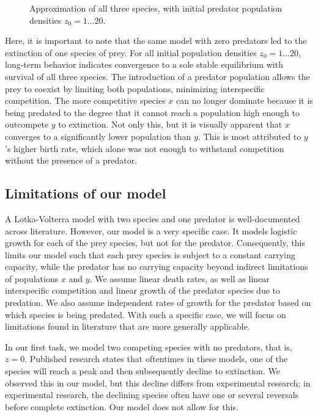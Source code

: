\begin{figure}[h]
    \centering
    \caption{Approximation of all three species, with initial predator population densities $z_0=1... 20$.}
    \label{fig:predator}
\end{figure}

Here, it is important to note that the same model with zero predators led to the extinction of one species of prey. For all initial population densities $z_0=1... 20$, long-term behavior indicates convergence to a sole stable equilibrium with survival of all three species. The introduction of a predator population allows the prey to coexist by limiting both populations, minimizing interspecific competition. The more competitive species $x$ can no longer dominate because it is being predated to the degree that it cannot reach a population high enough to outcompete $y$ to extinction.  Not only this, but it is visually apparent that $x$ converges to a significantly lower population than $y$. This is most attributed to $y$'s higher birth rate, which alone was not enough to withstand competition without the presence of a predator. 

\subsection{Limitations of our model}
A Lotka-Volterra model with two species and one predator is well-documented across literature. However, our model is a very specific case. It models logistic growth for each of the prey species, but not for the predator. Consequently, this limits our model such that each prey species is subject to a constant carrying capacity, while the predator has no carrying capacity beyond indirect limitations of populations $x$ and $y$. We assume linear death rates, as well as linear interspecific competition and linear growth of the predator species due to predation. We also assume independent rates of growth for the predator based on which species is being predated. With such a specific case, we will focus on limitations found in literature that are more generally applicable. 

In our first task, we model two competing species with no predators, that is, $z=0$. 
Published research states that oftentimes in these models, one of the species will reach a peak and then subsequently decline to extinction. 
We observed this in our model, but this decline differs from experimental research; in experimental research, the declining species often have one or several reversals before complete extinction\cite{WangerskyLotkaVolterra}.
Our model does not allow for this. 

